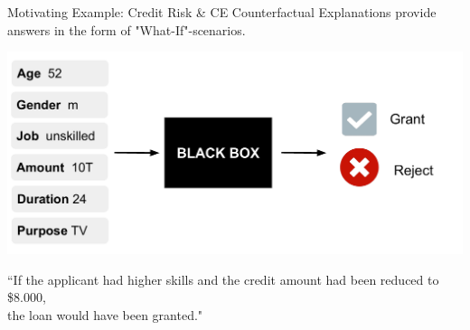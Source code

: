 \documentclass[11pt,compress,t,notes=noshow, aspectratio=169, xcolor=table, usenames,dvipsnames]{beamer}
\begin{document}
\begin{frame}{Motivating Example: Credit Risk \& CE}
	Counterfactual Explanations provide answers in the form of "What-If"-scenarios.
	
    \includegraphics[width=\linewidth, page=2]{figure/counterfactuals_credit.pdf}

	``If the applicant had higher skills and the credit amount had been reduced to \$8.000,\\ the loan would have been granted."  \\[0.2cm]

\end{frame}


\end{document}

